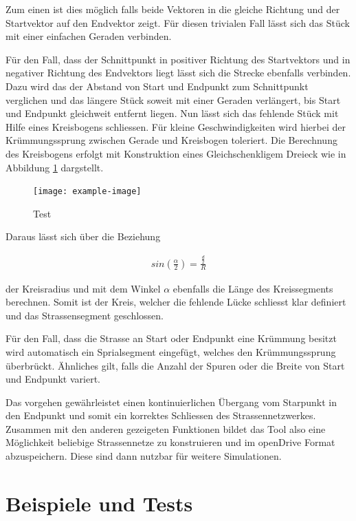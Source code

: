 Zum einen ist dies möglich falls beide Vektoren in die gleiche Richtung und der Startvektor auf den Endvektor zeigt. Für diesen trivialen Fall lässt sich das Stück mit einer einfachen Geraden verbinden. 

Für den Fall, dass der Schnittpunkt in positiver Richtung des Startvektors und in negativer Richtung des Endvektors liegt lässt sich die Strecke ebenfalls verbinden. Dazu wird das der Abstand von Start und Endpunkt zum Schnittpunkt verglichen und das längere Stück soweit mit einer Geraden verlängert, bis Start und Endpunkt gleichweit entfernt liegen. Nun lässt sich das fehlende Stück mit Hilfe eines Kreisbogens schliessen. Für kleine Geschwindigkeiten wird hierbei der Krümmungssprung zwischen Gerade und Kreisbogen toleriert. Die Berechnung des Kreisbogens erfolgt mit Konstruktion eines Gleichschenkligem Dreieck wie in Abbildung \ref{abb5} dargstellt. 

\begin{figure}[H]
	\flushleft
	\texttt{[image: example-image]}
	\caption{Test}
	\label{abb5}
\end{figure}

Daraus lässt sich über die Beziehung 

\begin{align}
        sin(\frac{\alpha}{2}) = \frac{\frac{d}{2}}{R}
\end{align}

der Kreisradius und mit dem Winkel \(\alpha\) ebenfalls die Länge des Kreissegments berechnen. Somit ist der Kreis, welcher die fehlende Lücke schliesst klar definiert und das Strassensegment geschlossen.

Für den Fall, dass die Strasse an Start oder Endpunkt eine Krümmung besitzt wird automatisch ein Sprialsegment eingefügt, welches den Krümmungssprung überbrückt. Ähnliches gilt, falls die Anzahl der Spuren oder die Breite von Start und Endpunkt variert.

Das vorgehen gewährleistet einen kontinuierlichen Übergang vom Starpunkt in den Endpunkt und somit ein korrektes Schliessen des Strassennetzwerkes. Zusammen mit den anderen gezeigeten Funktionen bildet das Tool also eine Möglichkeit beliebige Strassennetze zu konstruieren und im openDrive Format abzuspeichern. Diese sind dann nutzbar für weitere Simulationen.

\chapter{Beispiele und Tests}

